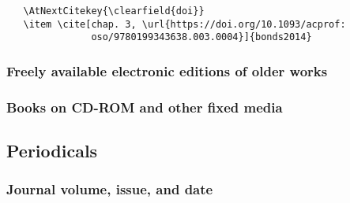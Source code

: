 \documentclass[11pt,letterpaper,oneside]{article}
\begin{document}
\begin{verbatim}
   \AtNextCitekey{\clearfield{doi}}
   \item \cite[chap. 3, \url{https://doi.org/10.1093/acprof:
               oso/9780199343638.003.0004}]{bonds2014}
\end{verbatim}

\begin{citebib}
\item \cite[chap. 3, \url{https://doi.org/10.1093/acprof:oso/9780199343638.003.0004}]{bonds2014}
\item \cite[59]{lystra2004}
\item \cite[chap. 11, \url{https://doi.org/10.1093/acprof:oso/9780199343638.003.0012}]{bonds2014}
\item \cite[60--61]{lystra2004}
\end{citebib}

\subsubsection{Freely available electronic editions of older works}

\begin{citebib}
\item \cite{james2008}
\end{citebib}

\subsubsection{Books on CD-ROM and other fixed media}

\begin{citebib}
\item \cite[1.4]{chicago2003}
\end{citebib}

\setcounter{subsection}{5}
\subsection{Periodicals}
\setcounter{subsection}{14}

\setcounter{subsubsection}{170}
\subsubsection{Journal volume, issue, and date}
\end{document}
